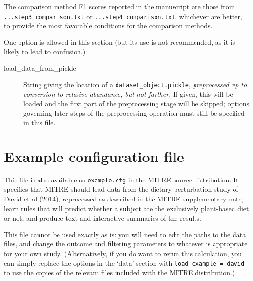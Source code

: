 \documentclass[12pt]{report}
\begin{document}
The comparison method F1 scores reported in the manuscript are those
from \texttt{...step3\_comparison.txt} or \texttt{...step4\_comparison.txt},
whichever are better, to provide the most favorable conditions for the
comparison methods.

One option is allowed in this section (but its use is
not recommended, as it is likely to lead to confusion.)
\begin{description}
\item[load\_data\_from\_pickle] String giving the location of a
  \texttt{dataset\_object.pickle}, \textit{preprocessed up to
    conversion to relative abundance, but not farther.} If given, this
  will be loaded and the first part of the preprocessing stage will be
  skipped; options governing later steps of the preprocessing
  operation must still be specified in this file.
\end{description}

\chapter{Example configuration file}\label{sample}
This file is also available as \texttt{example.cfg} in the MITRE
source distribution. It specifies that MITRE should load data from the
dietary perturbation study of David et al (2014), reprocessed as
described in the MITRE supplementary note, learn rules that will
predict whether a subject ate the exclusively plant-based diet or not,
and produce text and interactive summaries of the results.

This file cannot be used exactly as is: you will need to edit the
paths to the data files, and change the outcome and filtering
parameters to whatever is appropriate for your own
study. (Alternatively, if you do want to rerun this calculation, you
can simply replace the options in the `data' section with
\texttt{load\_example = david} to use the copies of the relevant files
included with the MITRE distribution.)
\end{document}
